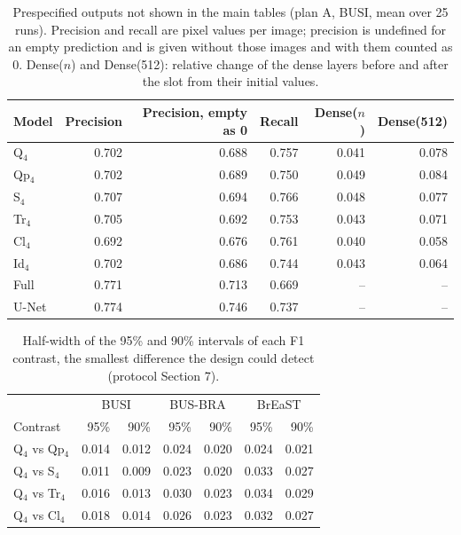 \begin{table}[!ht]
\centering
\caption{Prespecified outputs not shown in the main tables (plan A, BUSI, mean over 25 runs). Precision and recall are pixel values per image; precision is undefined for an empty prediction and is given without those images and with them counted as 0. Dense($n$) and Dense(512): relative change of the dense layers before and after the slot from their initial values.}\label{stab:protout}
\footnotesize
\begin{tabular}{@{}lrrrrr@{}}
\toprule
Model & Precision & Precision, empty as 0 & Recall & Dense($n$) & Dense(512) \\
\midrule
Q$_4$ & 0.702 & 0.688 & 0.757 & 0.041 & 0.078 \\
Qp$_4$ & 0.702 & 0.689 & 0.750 & 0.049 & 0.084 \\
S$_4$ & 0.707 & 0.694 & 0.766 & 0.048 & 0.077 \\
Tr$_4$ & 0.705 & 0.692 & 0.753 & 0.043 & 0.071 \\
Cl$_4$ & 0.692 & 0.676 & 0.761 & 0.040 & 0.058 \\
Id$_4$ & 0.702 & 0.686 & 0.744 & 0.043 & 0.064 \\
Full & 0.771 & 0.713 & 0.669 & -- & -- \\
U-Net & 0.774 & 0.746 & 0.737 & -- & -- \\
\bottomrule
\end{tabular}
\end{table}

\begin{table}[!ht]
\centering
\caption{Half-width of the 95\% and 90\% intervals of each F1 contrast, the smallest difference the design could detect (protocol Section 7).}\label{stab:mdd}
\footnotesize
\begin{tabular}{@{}lrrrrrr@{}}
\toprule
 & \multicolumn{2}{c}{BUSI} & \multicolumn{2}{c}{BUS-BRA} & \multicolumn{2}{c}{BrEaST} \\
Contrast & 95\% & 90\% & 95\% & 90\% & 95\% & 90\% \\
\midrule
Q$_4$ vs Qp$_4$ & 0.014 & 0.012 & 0.024 & 0.020 & 0.024 & 0.021 \\
Q$_4$ vs S$_4$ & 0.011 & 0.009 & 0.023 & 0.020 & 0.033 & 0.027 \\
Q$_4$ vs Tr$_4$ & 0.016 & 0.013 & 0.030 & 0.023 & 0.034 & 0.029 \\
Q$_4$ vs Cl$_4$ & 0.018 & 0.014 & 0.026 & 0.023 & 0.032 & 0.027 \\
\bottomrule
\end{tabular}
\end{table}

